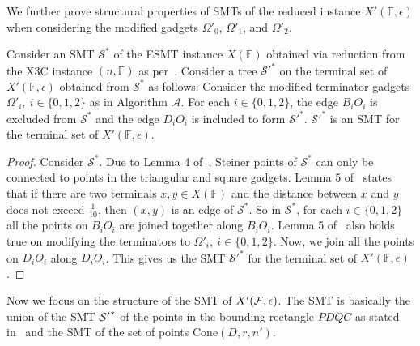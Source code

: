 We further prove structural properties of SMTs of the reduced instance $X'(\mathbb{F},\epsilon)$ when considering the modified gadgets $\Omega'_0$, $\Omega'_1$, and $\Omega'_2$.
\begin{lemma}\label{lem:modified_smt}
    Consider an SMT $\mathcal{S}^*$ of the ESMT instance $X(\mathbb{F})$ obtained via reduction from the X3C instance $(n,\mathbb{F})$ as per~\cite{garey1977complexity}. Consider a tree $\mathcal{S'}^{*}$ on the terminal set of $X'(\mathbb{F},\epsilon)$ obtained from $\mathcal{S}^*$ as follows: Consider the modified terminator gadgets $\Omega'_i,~i \in \{0,1,2\}$ as in Algorithm $\mathcal{A}$. For each $i \in \{0,1,2\}$, the edge $B_iO_i$ is excluded from $\mathcal{S}^*$ and the edge $D_iO_i$ is included to form $\mathcal{S'}^{*}$. $\mathcal{S'}^{*}$ is an SMT for the terminal set of $X'(\mathbb{F},\epsilon)$.
\end{lemma}

\begin{proof}
    Consider $\mathcal{S}^*$. Due to Lemma 4 of~\cite{garey1977complexity}, Steiner points of $\mathcal{S}^*$ can only be connected to points in the triangular and square gadgets. Lemma 5 of~\cite{garey1977complexity} states that if there are two terminals $x,y \in X(\mathbb{F})$ and the distance between $x$ and $y$ does not exceed $\frac{1}{10}$, then $(x,y)$ is an edge of $\mathcal{S}^{*}$. So in $\mathcal{S}^{*}$, for each $i \in \{0,1,2\}$ all the points on $B_iO_i$ are joined together along $B_iO_i$. Lemma 5 of~\cite{garey1977complexity} also holds true on modifying the terminators to $\Omega'_i,~i \in \{0,1,2\}$. Now, we join all the points on $D_iO_i$ along $D_iO_i$. This gives us the SMT $\mathcal{S'}^*$ for the terminal set of $X'(\mathbb{F},\epsilon)$.
\end{proof}


Now we focus on the structure of the SMT of $X'(\mathcal{F},\epsilon)$. The SMT is basically the union of the SMT $\mathcal{S'}^{*}$ of the points in the bounding rectangle $PDQC$ as stated in~ and the SMT of the set of points $\mathrm{Cone}(D,r,n')$.

